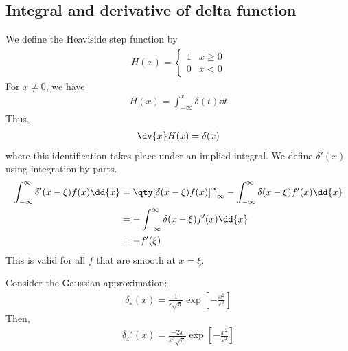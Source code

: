 \subsection{Integral and derivative of delta function}
We define the Heaviside step function by
\begin{align*}
	H(x) = \begin{cases}
		1 & x \geq 0 \\
		0 & x < 0
	\end{cases}
\end{align*}
For $x \neq 0$, we have
\begin{align*}
	H(x) = \int_{-\infty}^x \delta(t) \dd{t}
\end{align*}
Thus,
\begin{align*}
	\dv{x} H(x) = \delta(x)
\end{align*}
where this identification takes place under an implied integral.
We define $\delta'(x)$ using integration by parts.
\begin{align*}
	\int_{-\infty}^\infty \delta'(x-\xi) f(x) \dd{x} &= \qty[\delta(x-\xi) f(x)]_{-\infty}^\infty - \int_{-\infty}^\infty \delta(x-\xi) f'(x) \dd{x} \\
    &= - \int_{-\infty}^\infty \delta(x-\xi) f'(x) \dd{x} \\
    &= - f'(\xi)
\end{align*}
This is valid for all $f$ that are smooth at $x = \xi$.
\begin{example}
	Consider the Gaussian approximation:
	\begin{align*}
		\delta_\varepsilon(x) = \frac{1}{\varepsilon \sqrt{\pi}} \exp[-\frac{x^2}{\varepsilon^2}]
	\end{align*}
	Then,
	\begin{align*}
		\delta_\varepsilon'(x) = \frac{-2x}{\varepsilon^3 \sqrt{\pi}} \exp[-\frac{x^2}{\varepsilon^2}]
	\end{align*}
\end{example}

